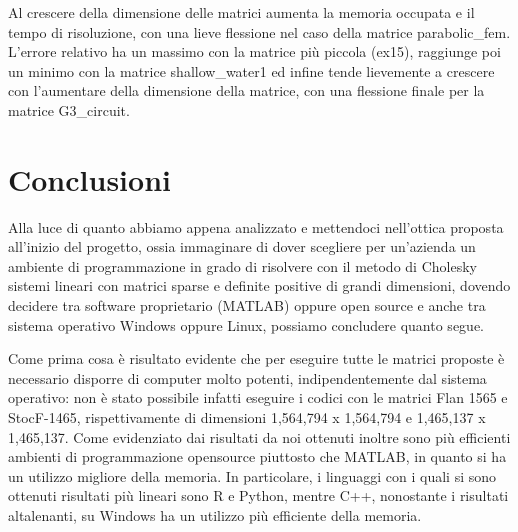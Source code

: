 \documentclass[a4paper,10pt]{article}
\begin{document}
Al crescere della dimensione delle matrici aumenta la memoria occupata e il tempo di risoluzione, con una lieve flessione nel caso della matrice parabolic\_fem.
L’errore relativo ha un massimo con la matrice più piccola (ex15), raggiunge poi un minimo con la matrice shallow\_water1 ed infine tende lievemente a crescere con l’aumentare della dimensione della matrice, con una flessione finale per la matrice G3\_circuit.

\newpage

\section{Conclusioni}

Alla luce di quanto abbiamo appena analizzato e mettendoci nell’ottica proposta all’inizio del progetto, ossia immaginare di dover scegliere per un’azienda un ambiente di programmazione in grado di risolvere con il metodo di Cholesky sistemi lineari con matrici sparse e deﬁnite positive di grandi dimensioni, dovendo decidere tra software proprietario (MATLAB) oppure open source e anche tra sistema operativo Windows oppure Linux, possiamo concludere quanto segue.

Come prima cosa è risultato evidente che per eseguire tutte le matrici proposte è necessario disporre di computer molto potenti, indipendentemente dal sistema operativo: non è stato possibile infatti eseguire i codici con le matrici Flan 1565 e StocF-1465, rispettivamente di dimensioni 1,564,794 x 1,564,794 e 1,465,137 x 1,465,137.
Come evidenziato dai risultati da noi ottenuti inoltre sono più efficienti ambienti di programmazione opensource piuttosto che MATLAB, in quanto si ha un utilizzo migliore della memoria. In particolare, i linguaggi con i quali si sono ottenuti risultati più lineari sono R e Python, mentre C++, nonostante i risultati altalenanti, su Windows ha un utilizzo più efficiente della memoria.
\end{document}
